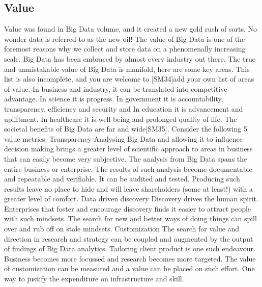 {\subsection{Value} 
Value was found in Big Data volume, and it created a new gold rush of sorts.  No wonder data is referred to as the new oil!  The value of Big Data is one of the foremost reasons why we collect and store data on a phenomenally increasing scale.  Big Data has been embraced by almost every industry out there.
The true and unmistakable value of Big Data is manifold, here are some key areas.  This list is also incomplete, and you are welcome to [SM34]add your own list of areas of value.
In business and industry, it can be translated into competitive advantage. 
In science it is progress.
In government it is accountability, transparency, efficiency and security and 
In education it is advancement and upliftment.
In healthcare it is well-being and prolonged quality of life.
The societal benefits of Big Data are far and wide[SM35].  
Consider the following 5 value metrics:
Transparency
Analysing Big Data and allowing it to influence decision making brings a greater level of scientific approach to areas in business that can easily become very subjective.  The analysis from Big Data spans the entire business or enterprise.  The results of such analysis become documentable and repeatable and verifiable.  It can be audited and tested.  Producing such results leave no place to hide and will leave shareholders (some at least!) with a greater level of comfort.
Data driven discovery
Discovery drives the human spirit.  Enterprises that foster and encourage discovery finds it easier to attract people with such mindsets. The search for new and better ways of doing things can spill over and rub off on stale mindsets.
Customization
The search for value and direction in research and strategy can be coupled and augmented by the output of findings of Big Data analytics.   Tailoring client product is one such endeavour.  Business becomes more focussed and research becomes more targeted.  The value of customization can be measured and a value can be placed on such effort.  One way to justify the expenditure on infrastructure and skill.

}
